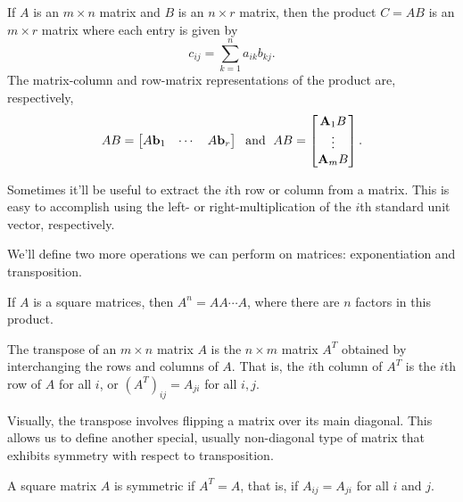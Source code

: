 \documentclass[../m073main.tex]{subfiles}
\begin{document}
\begin{definition}
	If $A$ is an $m\times n$ matrix and $B$ is an $n\times r$ matrix, then the product $C = AB$ is an $m\times r$ matrix where each entry is given by
	\[ c_{ij} = \sum_{k=1}^n a_{ik} b_{kj}. \]
	The matrix-column and row-matrix representations of the product are, respectively,
	\[ AB = \begin{bmatrix} A \mathbf{b}_1 & \cdots & A \mathbf{b}_r \end{bmatrix} \;\text{ and }\; AB = \begin{bmatrix} \mathbf{A}_1 B \\ \vdots \\ \mathbf{A}_m B \end{bmatrix}. \]
\end{definition}

Sometimes it'll be useful to extract the $i$th row or column from a matrix.
This is easy to accomplish using the left- or right-multiplication of the $i$th standard unit vector, respectively.

We'll define two more operations we can perform on matrices: exponentiation and transposition.

\begin{definition}
	If $A$ is a square matrices, then $A^n = AA\cdots A$, where there are $n$ factors in this product.

	The transpose of an $m\times n$ matrix $A$ is the $n\times m$ matrix $A^T$ obtained by interchanging the rows and columns of $A$.
	That is, the $i$th column of $A^T$ is the $i$th row of $A$ for all $i$, or $(A^T)_{ij} = A_{ji}$ for all $i, j$.
\end{definition}

Visually, the transpose involves flipping a matrix over its main diagonal.
This allows us to define another special, usually non-diagonal type of matrix that exhibits symmetry with respect to transposition.

\begin{definition}
	A square matrix $A$ is symmetric if $A^T = A$, that is, if $A_{ij} = A_{ji}$ for all $i$ and $j$.
\end{definition}


\end{document}
